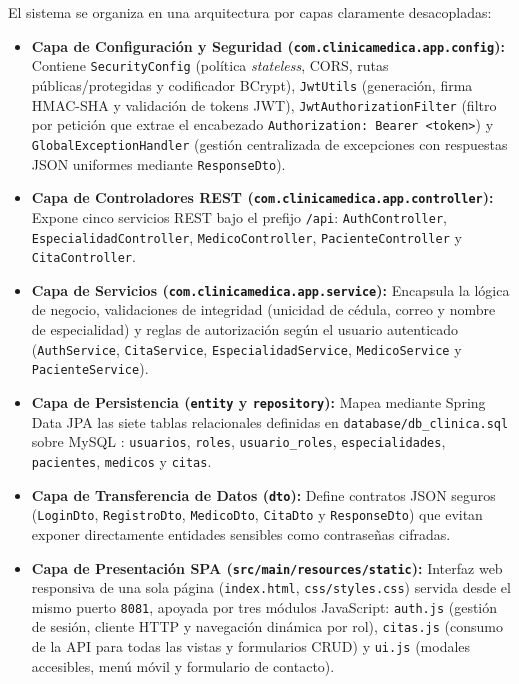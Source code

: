 \documentclass{article}
\begin{document}
El sistema se organiza en una arquitectura por capas claramente desacopladas:
\begin{itemize}
    \item \textbf{Capa de Configuración y Seguridad (\texttt{com.clinicamedica.app.config}):} Contiene \texttt{SecurityConfig} (política \textit{stateless}, CORS, rutas públicas/protegidas y codificador BCrypt), \texttt{JwtUtils} (generación, firma HMAC-SHA y validación de tokens JWT), \texttt{JwtAuthorizationFilter} (filtro por petición que extrae el encabezado \texttt{Authorization: Bearer <token>}) y \texttt{GlobalExceptionHandler} (gestión centralizada de excepciones con respuestas JSON uniformes mediante \texttt{ResponseDto}).
    \item \textbf{Capa de Controladores REST (\texttt{com.clinicamedica.app.controller}):} Expone cinco servicios REST bajo el prefijo \texttt{/api}: \texttt{AuthController}, \texttt{EspecialidadController}, \texttt{MedicoController}, \texttt{PacienteController} y \texttt{CitaController}.
    \item \textbf{Capa de Servicios (\texttt{com.clinicamedica.app.service}):} Encapsula la lógica de negocio, validaciones de integridad (unicidad de cédula, correo y nombre de especialidad) y reglas de autorización según el usuario autenticado (\texttt{AuthService}, \texttt{CitaService}, \texttt{EspecialidadService}, \texttt{MedicoService} y \texttt{PacienteService}).
    \item \textbf{Capa de Persistencia (\texttt{entity} y \texttt{repository}):} Mapea mediante Spring Data JPA \cite{springboot2025} las siete tablas relacionales definidas en \texttt{database/db\_clinica.sql} sobre MySQL \cite{mysql2025}: \texttt{usuarios}, \texttt{roles}, \texttt{usuario\_roles}, \texttt{especialidades}, \texttt{pacientes}, \texttt{medicos} y \texttt{citas}.
    \item \textbf{Capa de Transferencia de Datos (\texttt{dto}):} Define contratos JSON seguros (\texttt{LoginDto}, \texttt{RegistroDto}, \texttt{MedicoDto}, \texttt{CitaDto} y \texttt{ResponseDto}) que evitan exponer directamente entidades sensibles como contraseñas cifradas.
    \item \textbf{Capa de Presentación SPA (\texttt{src/main/resources/static}):} Interfaz web responsiva de una sola página (\texttt{index.html}, \texttt{css/styles.css}) servida desde el mismo puerto \texttt{8081}, apoyada por tres módulos JavaScript: \texttt{auth.js} (gestión de sesión, cliente HTTP y navegación dinámica por rol), \texttt{citas.js} (consumo de la API para todas las vistas y formularios CRUD) y \texttt{ui.js} (modales accesibles, menú móvil y formulario de contacto).
\end{itemize}
\end{document}
